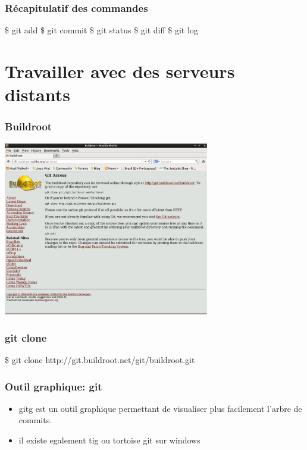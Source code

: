 \documentclass{beamer}
\begin{document}
\begin{frame}[fragile]
  \frametitle{Récapitulatif des commandes}
  \begin{semiverbatim}
    \$ git add
    \$ git commit
    \$ git status
    \$ git diff
    \$ git log
  \end{semiverbatim}


\end{frame}


\section{Travailler avec des serveurs distants}
\begin{frame}
  \frametitle{Buildroot}
  \includegraphics[width=9cm]{imgs/buildroot.eps}
\end{frame}


\begin{frame}
  \frametitle{git clone}
  \begin{semiverbatim}
    \$ git clone http://git.buildroot.net/git/buildroot.git
  \end{semiverbatim}
\end {frame}


\begin{frame}
  \frametitle{Outil graphique: git}
  \begin{itemize}
  \item gitg est un outil graphique permettant de visualiser plus facilement l'arbre de commits.
  \item il existe egalement tig ou tortoise git sur windows
  \end{itemize}
\end{frame}
\end{document}
